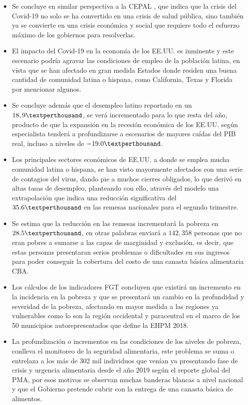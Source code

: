 \begin{itemize}
	\item Se concluye en similar perspectiva a la CEPAL \cite{cepal2020dimensionar}, que indica que la crisis del Covid-19 no solo se ha convertido en una crisis de salud pública, sino también ya se convierte en una crisis económica y social que requiere todo el esfuerzo máximo de los gobiernos para resolverlas.
	\item El impacto del Covid-19 en la economía de los EE.UU. es inminente y este escenario podría agravar las condiciones de empleo de la población latina, en vista que se han afectado en gran medida Estados donde residen una buena cantidad de comunidad latina o hispana, como California, Texas y Florida por mencionar algunos.
	\item Se concluye además que el desempleo latino reportado en un $18,9 \textperthousand$, se verá incrementado para lo que resta del año, producto de que la expansión en la recesión económica de los EE.UU. según especialista tenderá a profundizarse a escenarios de mayores caídas del PIB real, incluso a niveles de $-19.0 \textperthousand$. 
	\item Los principales sectores económicos de EE.UU. a donde se emplea mucha comunidad latina o hispana, se han visto mayormente afectados con una serie de contagios del virus, dando pie a muchos cierres obligados, lo que derivó en altas tasas de desempleo, planteando con ello, através del modelo una extrapolación que indica una reducción significativa del $35.6 \textperthousand$ en las remesas nacionales para el segundo trimestre.
	\item Se estima que la reducción en las remesas incrementará la pobreza en $28.5 \textperthousand$, en otras palabras enviará a $142,358$ personas que no eran pobres a sumarse a las capas de marginidad y exclusión, es decir, que estas personas presentaran serios problemas o dificultades en sus ingresos para poder conseguir la cobertura del costo de una canasta básica alimentaria CBA.
	\item Los cálculos de los indicadores FGT concluyen que existirá un incremento en la incidencia en la pobreza y que se presentará un cambio en la profundidad y severidad de la pobreza, afectando en mayor medida a las regiones ya vulnerables como lo son la región occidental y paracentral en el marco de los 50 municipios autorepresentados que define la EHPM 2018.
	\item La profundización o incrementos en las condiciones de los niveles de pobreza, conlleva el monitoreo de la seguridad alimentaria, este problema se suma o entrelaza a los más de 302 mil individuos que venían ya presentando fase de crisis y urgencia alimentaria desde el año 2019 según el reporte global del PMA, por esos motivos se observan muchas banderas blancas a nivel nacional y que el Gobierno pretende cubrir con la entrega de una canasta básica de alimentos. 

\end{itemize}
